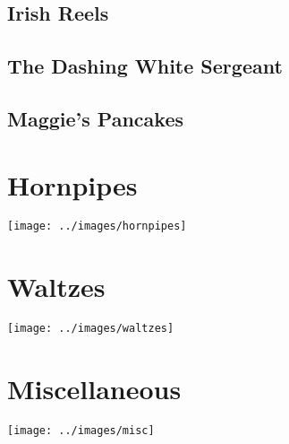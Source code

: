 \documentclass[12pt]{report}
\begin{document}
\section{Irish Reels}


\section{The Dashing White Sergeant}


\newpage
\section{Maggie's Pancakes}


\chapter{Hornpipes}
\begin{center}
\texttt{[image: ../images/hornpipes]}
\end{center}

\chapter{Waltzes}
\begin{center}
\texttt{[image: ../images/waltzes]}
\end{center}



\chapter{Miscellaneous}
\begin{center}
\texttt{[image: ../images/misc]}
\end{center}
\end{document}
